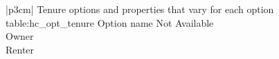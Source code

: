 \begin{customLongTable}{ |p{3cm}| }
{Tenure options and properties that vary for each option} {table:hc_opt_tenure}
{Option name}
Not Available \\ \hline
Owner \\ \hline
Renter \\
\end{customLongTable}

